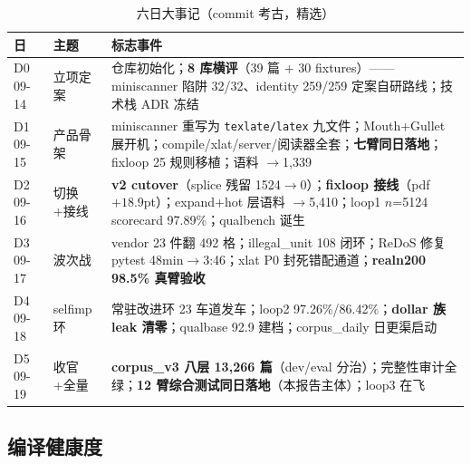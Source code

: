 \begin{table}[htbp]
\centering\small
\caption{六日大事记（commit 考古，精选）}
\label{tab:days}
\begin{tabular}{@{}llp{9.2cm}@{}}
\toprule
日 & 主题 & 标志事件 \\
\midrule
D0 09-14 & 立项定案 & 仓库初始化；\textbf{8 库横评}（39 篇 + 30 fixtures）——miniscanner 陷阱 32/32、identity 259/259 定案自研路线；技术栈 ADR 冻结 \\
D1 09-15 & 产品骨架 & miniscanner 重写为 \texttt{texlate/latex} 九文件；Mouth+Gullet 展开机；compile/xlat/server/阅读器全套；\textbf{七臂同日落地}；fixloop 25 规则移植；语料 $\to$1{,}339 \\
D2 09-16 & 切换+接线 & \textbf{v2 cutover}（splice 残留 1524$\to$0）；\textbf{fixloop 接线}（pdf $+18.9$pt）；expand+hot 层语料 $\to$5{,}410；loop1 $n$=5124 scorecard 97.89\%；qualbench 诞生 \\
D3 09-17 & 波次战 & vendor 23 件翻 492 格；illegal\_unit 108 闭环；ReDoS 修复 pytest 48min$\to$3:46；xlat P0 封死错配通道；\textbf{realn200 98.5\% 真臂验收} \\
D4 09-18 & selfimp 环 & 常驻改进环 23 车道发车；loop2 97.26\%/86.42\%；\textbf{dollar 族 leak 清零}；qualbase 92.9 建档；corpus\_daily 日更渠启动 \\
D5 09-19 & 收官+全量 & \textbf{corpus\_v3 八层 13{,}266 篇}（dev/eval 分治）；完整性审计全绿；\textbf{12 臂综合测试同日落地}（本报告主体）；loop3 在飞 \\
\bottomrule
\end{tabular}
\end{table}

\subsection{编译健康度}

